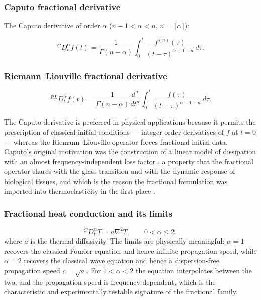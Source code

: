 \subsubsection{Caputo fractional derivative}

The Caputo derivative of order $\alpha$ ($n-1 < \alpha < n$, $n = \lceil\alpha\rceil$):

\begin{equation}
{}^C D_t^\alpha f(t) = \frac{1}{\Gamma(n-\alpha)}\int_0^t \frac{f^{(n)}(\tau)}{(t-\tau)^{\alpha+1-n}}\,d\tau.
\label{eq:6.3}
\end{equation}

\subsubsection{Riemann--Liouville fractional derivative}

\begin{equation}
{}^{RL} D_t^\alpha f(t) = \frac{1}{\Gamma(n-\alpha)}\frac{d^n}{dt^n}\int_0^t \frac{f(\tau)}{(t-\tau)^{\alpha+1-n}}\,d\tau.
\label{eq:6.4}
\end{equation}

The Caputo derivative is preferred in physical applications because it permits the prescription of classical initial conditions --- integer-order derivatives of $f$ at $t = 0$ --- whereas the Riemann--Liouville operator forces fractional initial data. Caputo's original motivation was the construction of a linear model of dissipation with an almost frequency-independent loss factor \cite{Caputo1967}, a property that the fractional operator shares with the glass transition and with the dynamic response of biological tissues, and which is the reason the fractional formulation was imported into thermoelasticity in the first place \cite{Gorenflo1997,Luchko2010}.

\subsubsection{Fractional heat conduction and its limits}

\begin{equation}
{}^C D_t^\alpha T = a\nabla^2 T, \qquad 0 < \alpha \leq 2,
\label{eq:6.5}
\end{equation}
where $a$ is the thermal diffusivity. The limits are physically meaningful: $\alpha = 1$ recovers the classical Fourier equation and hence infinite propagation speed, while $\alpha = 2$ recovers the classical wave equation and hence a dispersion-free propagation speed $c = \sqrt{a}$. For $1 < \alpha < 2$ the equation interpolates between the two, and the propagation speed is frequency-dependent, which is the characteristic and experimentally testable signature of the fractional family.

